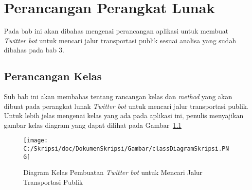 \chapter{Perancangan Perangkat Lunak}
\label{chap:perancangan perangkat lunak}

Pada bab ini akan dibahas mengenai perancangan aplikasi untuk membuat \textit{Twitter bot} untuk mencari jalur transportasi publik sesuai analisa yang sudah dibahas pada bab 3.

\section{Perancangan Kelas}
Sub bab ini akan membahas tentang rancangan kelas dan \textit{method} yang akan dibuat pada perangkat lunak \textit{Twitter bot} untuk mencari jalur transportasi publik. Untuk lebih jelas mengenai kelas yang ada pada aplikasi ini, penulis menyajikan gambar kelas diagram yang dapat dilihat pada Gambar~\ref{fig:classDiagramSkripsi}

\begin{figure}[htbp]
	\centering
		\texttt{[image: C:/Skripsi/doc/DokumenSkripsi/Gambar/classDiagramSkripsi.PNG]}
	\caption{Diagram Kelas Pembuatan \textit{Twitter bot} untuk Mencari Jalur Transportasi Publik}
	\label{fig:classDiagramSkripsi}
\end{figure}


